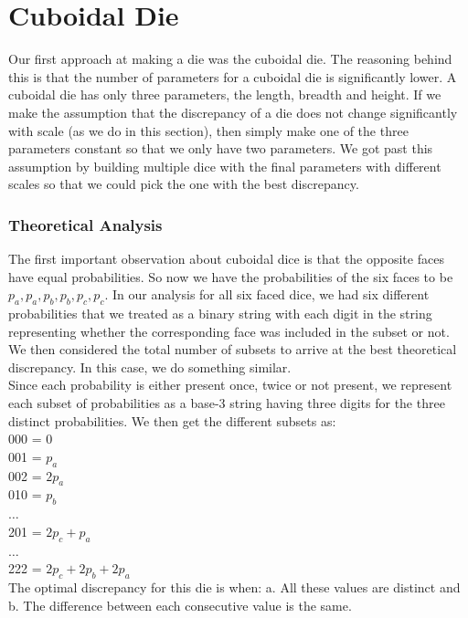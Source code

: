 \section{Cuboidal Die}
Our first approach at making a die was the cuboidal die. The reasoning behind this is that the number of parameters for a cuboidal die is significantly lower. A cuboidal die has only three parameters, the length, breadth and height. If we make the assumption that the discrepancy of a die does not change significantly with scale (as we do in this section), then simply make one of the three parameters constant so that we only have two parameters. We got past this assumption by building multiple dice with the final parameters with different scales so that we could pick the one with the best discrepancy.\\
\subsubsection{Theoretical Analysis}
The first important observation about cuboidal dice is that the opposite faces have equal probabilities. So now we have the probabilities of the six faces to be $p_a, p_a, p_b, p_b, p_c, p_c$. In our analysis for all six faced dice, we had six different probabilities that we treated as a binary string with each digit in the string representing whether the corresponding face was included in the subset or not. We then considered the total number of subsets to arrive at the best theoretical discrepancy. In this case, we do something similar.\\
Since each probability is either present once, twice or not present, we represent each subset of probabilities as a base-3 string having three digits for the three distinct probabilities. We then get the different subsets as:\\
000 = 0\\
001 = $p_a$\\
002 = $2p_a$\\
010 = $p_b$\\
$\ldots$\\
201 = $2p_c + p_a$\\
$\ldots$\\
222 = $2p_c + 2p_b + 2p_a$\\
The optimal discrepancy for this die is when: a. All these values are distinct and b. The difference between each consecutive value is the same.\\
